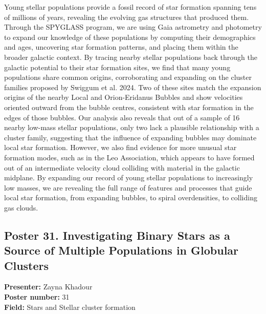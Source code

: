 Young stellar populations provide a fossil record of star formation spanning tens of millions of years, revealing the evolving gas structures that produced them. Through the SPYGLASS program, we are using Gaia astrometry and photometry to expand our knowledge of these populations by computing their demographics and ages, uncovering star formation patterns, and placing them within the broader galactic context. By tracing nearby stellar populations back through the galactic potential to their star formation sites, we find that many young populations share common origins, corroborating and expanding on the cluster families proposed by Swiggum et al. 2024. Two of these sites match the expansion origins of the nearby Local and Orion-Eridanus Bubbles and show velocities oriented outward from the bubble centres, consistent with star formation in the edges of those bubbles. Our analysis also reveals that out of a sample of 16 nearby low-mass stellar populations, only two lack a plausible relationship with a cluster family, suggesting that the influence of expanding bubbles may dominate local star formation. However, we also find evidence for more unusual star formation modes, such as in the Leo Association, which appears to have formed out of an intermediate velocity cloud colliding with material in the galactic midplane. By expanding our record of young stellar populations to increasingly low masses, we are revealing the full range of features and processes that guide local star formation, from expanding bubbles, to spiral overdensities, to colliding gas clouds.

\hypertarget{poster-abstract-talk-39}{}\label{poster-abstract-page-talk-39}
\subsection*{Poster 31. Investigating Binary Stars as a Source of Multiple Populations in Globular Clusters}
\textbf{Presenter:} Zayna Khadour\\
\textbf{Poster number:} 31\\
\textbf{Field:} Stars and Stellar cluster formation

